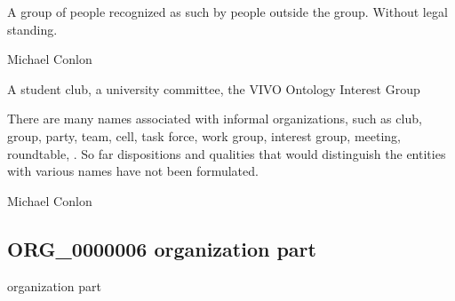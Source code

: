 \documentclass[letterpaper,10pt,english]{sphinxmanual}
\begin{document}
\begin{sphinxShadowBox}

\sphinxAtStartPar
A group of people recognized as such by people outside the group. Without legal standing.
\end{sphinxShadowBox}

\begin{sphinxShadowBox}

\sphinxAtStartPar
Michael Conlon 
\end{sphinxShadowBox}

\begin{sphinxShadowBox}

\sphinxAtStartPar
A student club, a university committee, the VIVO Ontology Interest Group
\end{sphinxShadowBox}

\begin{sphinxShadowBox}

\sphinxAtStartPar
There are many names associated with informal organizations, such as club, group, party, team, cell, task force, work group, interest group, meeting, roundtable, .  So far dispositions and qualities that would distinguish the entities with various names have not been formulated.
\end{sphinxShadowBox}

\begin{sphinxShadowBox}

\sphinxAtStartPar
Michael Conlon 
\end{sphinxShadowBox}
\begin{quote}

\ignorespaces \end{quote}


\subsection{ORG\_0000006 \sphinxhyphen{} organization part}
\label{\detokenize{doc-ORG_0000006:org-0000006-organization-part}}\label{\detokenize{doc-ORG_0000006:index-0}}\label{\detokenize{doc-ORG_0000006::doc}}
\begin{sphinxShadowBox}

\sphinxAtStartPar
organization part
\end{sphinxShadowBox}
\end{document}
